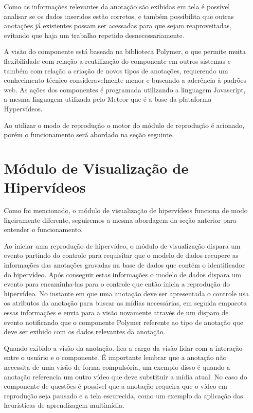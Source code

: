 Como as informações relevantes da anotação são exibidas em tela é possível analisar se os dados inseridos estão corretos, e também possibilita que outras anotações já existentes possam ser acessadas para que sejam reaproveitadas, evitando que haja um trabalho repetido desnecessariamente.

A visão do componente está baseada na biblioteca Polymer, o que permite muita flexibilidade com relação a reutilização do componente em outros sistemas e também com relação a criação de novos tipos de anotações, requerendo um conhecimento técnico consideravelmente menor e buscando a aderência à padrões web. As ações dos componentes é programada utilizando a linguagem Javascript, a mesma linguagem utilizada pelo Meteor que é a base da plataforma Hypervídeos.

Ao utilizar o modo de reprodução o motor do módulo de reprodução é acionado, porém o funcionamento será abordado na seção seguinte.

\section{Módulo de Visualização de Hipervídeos}

Como foi mencionado, o módulo de visualização de hipervídeos funciona de modo ligeiramente diferente, seguiremos a mesma abordagem da seção anterior para entender o funcionamento.

Ao iniciar uma reprodução de hipervídeo, o módulo de visualização dispara um evento partindo do controle para requisitar que o modelo de dados recupere as informações das anotações gravadas na base de dados que contém o identificador do hipervídeo. Após conseguir estas informações o modelo de dados dispara um evento para encaminha-las para o controle que então inicia a reprodução do hipervídeo. No instante em que uma anotação deve ser apresentada o controle usa os atributos da anotação para buscar as mídias necessárias, em seguida empacota essas informações e envia para a visão novamente através de um disparo de evento notificando que o componente Polymer referente ao tipo de anotação que deve ser exibido com os dados relevantes da anotação.

Quando exibido a visão da anotação, fica a cargo da visão lidar com a interação entre o usuário e o componente. É importante lembrar que a anotação não necessita de uma visão de forma compulsória, um exemplo disso é quando a anotação referencia um outro vídeo que deve substituir a mídia atual. No caso do componente de questões é possível que a anotação requeira que o vídeo em reprodução seja pausado e a tela escurecida, como um exemplo da aplicação das heurísticas de aprendizagem multimídia.

